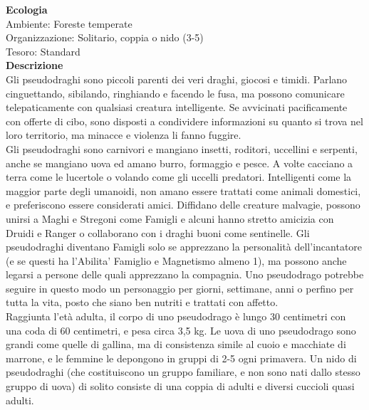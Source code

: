 \begin{multicols}{2}
\textbf{Ecologia}\\
Ambiente: Foreste temperate\\
Organizzazione: Solitario, coppia o nido (3-5)\\
Tesoro: Standard\\
\textbf{Descrizione}\\
Gli pseudodraghi sono piccoli parenti dei veri draghi, giocosi e timidi. Parlano cinguettando, sibilando, ringhiando e facendo le fusa, ma possono comunicare telepaticamente con qualsiasi creatura intelligente. Se avvicinati pacificamente con offerte di cibo, sono disposti a condividere informazioni su quanto si trova nel loro territorio, ma minacce e violenza li fanno fuggire.\\

Gli pseudodraghi sono carnivori e mangiano insetti, roditori, uccellini e serpenti, anche se mangiano uova ed amano burro, formaggio e pesce. A volte cacciano a terra come le lucertole o volando come gli uccelli predatori. Intelligenti come la maggior parte degli umanoidi, non amano essere trattati come animali domestici, e preferiscono essere considerati amici. Diffidano delle creature malvagie, possono unirsi a Maghi e Stregoni come Famigli e alcuni hanno stretto amicizia con Druidi e Ranger o collaborano con i draghi buoni come sentinelle. Gli pseudodraghi diventano Famigli solo se apprezzano la personalità dell’incantatore (e se questi ha l'Abilita' Famiglio e Magnetismo almeno 1), ma possono anche legarsi a persone delle quali apprezzano la compagnia. Uno pseudodrago potrebbe seguire in questo modo un personaggio per giorni, settimane, anni o perfino per tutta la vita, posto che siano ben nutriti e trattati con affetto.\\

Raggiunta l’età adulta, il corpo di uno pseudodrago è lungo 30 centimetri con una coda di 60 centimetri, e pesa circa 3,5 kg. Le uova di uno pseudodrago sono grandi come quelle di gallina, ma di consistenza simile al cuoio e macchiate di marrone, e le femmine le depongono in gruppi di 2-5 ogni primavera. Un nido di pseudodraghi (che costituiscono un gruppo familiare, e non sono nati dallo stesso gruppo di uova) di solito consiste di una coppia di adulti e diversi cuccioli quasi adulti.\\



\end{multicols}
